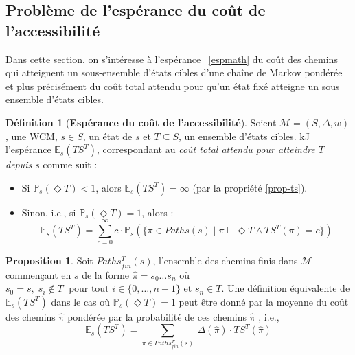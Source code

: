 \documentclass[12pt,a4paper]{report}
\theoremstyle{definition}%
\newtheorem{definition}{Définition}[chapter]
\newtheorem{proposition}{Proposition}[chapter]
\theoremstyle{remark}
\newcommand{\ie}{i.e., }
\newcommand{\pr}{\mathbb{P}}
\let\labelitemi\labelitemii
\begin{document}
\subsection{Problème de l'espérance du coût de l'accessibilité}
Dans cette section, on s'intéresse à l'espérance ~\ref{espmath} du coût des chemins qui atteignent un sous-ensemble d'états cibles d'une chaîne de Markov pondérée et plus précisément du coût total attendu pour qu'un état fixé atteigne un sous ensemble d'états cibles.

\begin{definition}[\textbf{Espérance du coût de l'accessibilité}]
	Soient $\mathcal{M} = (S, \Delta, w)$, une WCM, $s \in S$, un état de $s$ et $T \subseteq S$, un ensemble d'états cibles. kJ l'espérance $\mathbb{E}_s(TS^T)$, correspondant au \textit{coût total attendu pour atteindre $T$ depuis $s$} comme suit :
	\begin{itemize}
	\renewcommand{\labelitemi}{\tiny$\bullet$}
	\item 	Si $\pr_s(\Diamond T) < 1$, alors $\mathbb{E}_s(TS^T) = \infty$ (par la propriété \ref{prop-ts}).
	\item Sinon, \ie si $\pr_s(\Diamond T) = 1$, alors :
	\[ \mathbb{E}_s(TS^T) = \sum_{c = 0}^\infty c \cdot \pr_s(\{\pi \in Paths(s) \; | \; \pi \models \Diamond T \wedge TS^T(\pi) = c \})\]
	\end{itemize}
\end{definition}

\begin{proposition}
			Soit $Paths_{fin}^T(s)$, l'ensemble des chemins finis dans $\mathcal{M}$ commençant en $s$ de la forme $\hat{\pi} = s_0 \dots s_n$ où $s_0 = s, \;  s_i \notin T \; \text{ pour tout } i \in \{0, \dots, n-1\}$ et $s_n \in T$. Une définition équivalente de $\mathbb{E}_s(TS^T)$ dans le cas où $\pr_s(\Diamond T) = 1$ peut être donné par la moyenne du coût des chemins $\hat{\pi}$ pondérée par la probabilité de ces chemins $\hat{\pi}$ %
	, \ie
	\[\mathbb{E}_s(TS^T) = \sum_{\hat{\pi} \in Paths_{fin}^T(s)}\ \Delta(\hat{\pi}) \cdot TS^T(\hat{\pi})\]
\end{proposition}
\end{document}
